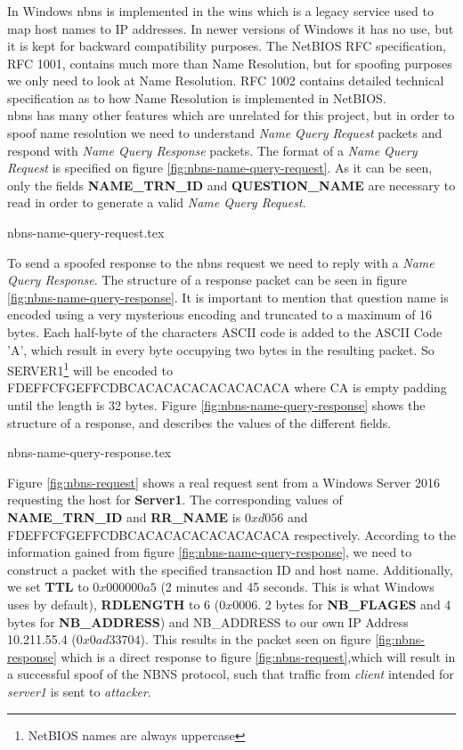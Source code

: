 \documentclass{article}
\begin{document}
\subsubsection{}
\label{sec:nbns}
In Windows \gls{nbns} is implemented in the \gls{wins} which is a legacy service used to map host names to IP addresses. In newer versions of Windows it has no use, but it is kept for backward compatibility purposes. The NetBIOS RFC specification, RFC 1001\cite{url:rfc:netbios}, contains much more than Name Resolution, but for spoofing purposes we only need to look at Name Resolution.
RFC 1002\cite{url:rfc:netbios-technical} contains detailed technical specification as to how Name Resolution is implemented in NetBIOS.\\
\gls{nbns} has many other features which are unrelated for this project, but in order to spoof name resolution we need to understand \emph{Name Query Request} packets and respond with \emph{Name Query Response} packets. The format of a \emph{Name Query Request} is specified on figure \ref{fig:nbns-name-query-request}. As it can be seen, only the fields \textbf{NAME\_TRN\_ID} and \textbf{QUESTION\_NAME} are necessary to read in order to generate a valid \emph{Name Query Request}.

{nbns-name-query-request.tex}

To send a spoofed response to the \gls{nbns} request we need to reply with a \emph{Name Query Response}. The structure of a response packet can be seen in figure \ref{fig:nbns-name-query-response}. It is important to mention that question name is encoded using a very mysterious encoding and truncated to a maximum of 16 bytes. Each half-byte of the characters ASCII code is added to the ASCII Code 'A'\cite{url:nbns-name-encoding}, which result in every byte occupying two bytes in the resulting packet. So SERVER1\footnote{NetBIOS names are always uppercase} will be encoded to FDEFFCFGEFFCDBCACACACACACACACACA where CA is empty padding until the length is 32 bytes. Figure \ref{fig:nbns-name-query-response} shows the structure of a response, and describes the values of the different fields.

{nbns-name-query-response.tex}

Figure \ref{fig:nbns-request} shows a real request sent from a Windows Server 2016 requesting the host for \textbf{Server1}. The corresponding values of \textbf{NAME\_TRN\_ID} and \textbf{RR\_NAME} is $0xd056$ and FDEFFCFGEFFCDBCACACACACACACACACA respectively. According to the information gained from figure \ref{fig:nbns-name-query-response}, we need to construct a packet with the specified transaction ID and host name. Additionally, we set \textbf{TTL} to $0x000000a5$ (2 minutes and 45 seconds. This is what Windows uses by default), \textbf{RDLENGTH} to 6 ($0x0006$. 2 bytes for \textbf{NB\_FLAGES} and 4 bytes for \textbf{NB\_ADDRESS}) and NB\_ADDRESS to our own IP Address 10.211.55.4 ($0x0ad33704$). This results in the packet seen on figure \ref{fig:nbns-response} which is a direct response to figure \ref{fig:nbns-request},which will result in a successful spoof of the NBNS protocol, such that traffic from \emph{client} intended for \emph{server1} is sent to \emph{attacker}.
\end{document}
